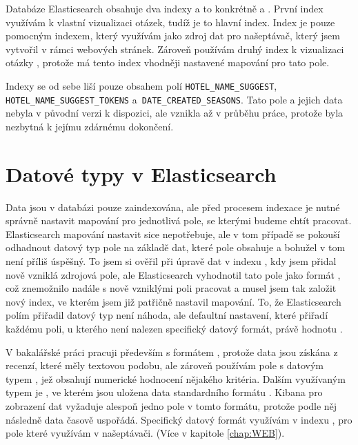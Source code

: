 \documentclass[czech,BP]{thesiskiv}
\begin{document}
Databáze Elasticsearch obsahuje dva indexy a to konkrétně  a . První index využívám k vlastní vizualizaci otázek, tudíž je to hlavní index. Index  je pouze pomocným indexem, který využívám jako zdroj dat pro našeptávač, který jsem vytvořil v rámci webových stránek. Zároveň používám druhý index k vizualizaci otázky , protože má tento index vhodněji nastavené mapování pro tato pole.


Indexy se od sebe liší pouze obsahem polí \texttt{HOTEL\_NAME\_SUGGEST},  \texttt{HO\-TEL\_NAME\_SUGGEST\_TOKENS} a\texttt{ DATE\_CREATED\_SEASONS}. Ta\-to pole a jejich data nebyla v původní verzi k dispozici, ale vznikla až v průběhu práce, protože byla nezbytná k jejímu zdárnému dokončení. 

\section{Datové typy v Elasticsearch}
Data jsou v databázi pouze zaindexována, ale před procesem indexace je nutné správně nastavit mapování pro jednotlivá pole, se kterými budeme chtít pracovat. Elasticsearch mapování nastavit sice nepotřebuje, ale v tom případě se pokouší odhadnout datový typ pole na základě dat, které pole obsahuje a bohužel v tom není příliš úspěšný. To jsem si ověřil při úpravě dat v indexu , kdy jsem přidal nově vzniklá zdrojová pole, ale Elasticsearch vyhodnotil tato pole jako formát , což znemožnilo nadále s nově vzniklými poli pracovat a musel jsem tak založit nový index, ve kterém jsem již patřičně nastavil mapování. To, že Elasticsearch polím přiřadil datový typ  není náhoda, ale defaultní nastavení, které přiřadí každému poli, u kterého není nalezen specifický datový formát, právě hodnotu .


V bakalářské práci pracuji především s formátem , protože data jsou získána z recenzí, které měly textovou podobu, ale zároveň používám pole s datovým typem , jež obsahují numerické hodnocení nějakého kritéria. Dalším využívaným typem je , ve kterém jsou uložena data standardního formátu . Kibana pro zobrazení dat vyžaduje alespoň jedno pole v tomto formátu, protože podle něj následně data časově uspořádá. Specifický datový formát  využívám v indexu , pro pole které využívám v našeptávači. (Více v kapitole \ref{chap:WEB}).
\end{document}

